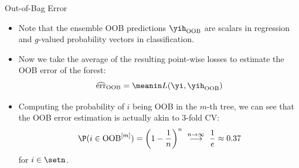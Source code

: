 \documentclass[11pt,compress,t,notes=noshow, xcolor=table]{beamer}
\begin{document}

\begin{vbframe}{Out-of-Bag Error}


\footnotesize

\begin{itemize}
  \item Note that the ensemble OOB predictions $\yih_{\text{OOB}}$ are scalars 
  in regression and $g$-valued probability vectors in classification.
  \item Now we take the average of the resulting point-wise losses to 
  estimate the OOB error of the forest:
  $$\widehat{\text{err}}_{\text{OOB}} = \meanin L(\yi, \yih_{\text{OOB}})$$
  \item Computing the probability of $i$ being OOB in the $m$-th tree,
  we can see that the OOB error estimation is actually akin to 3-fold CV:
  $$\P(i \in \text{OOB}^{[m]}) = \left(1 - \frac{1}{n}\right)^n 
  \ \stackrel{n \to \infty}{\longrightarrow} \ \frac{1}{e} \approx 0.37$$ for 
  $i \in \setn$.
\end{itemize}

\end{vbframe}

\endlecture
\end{document}

